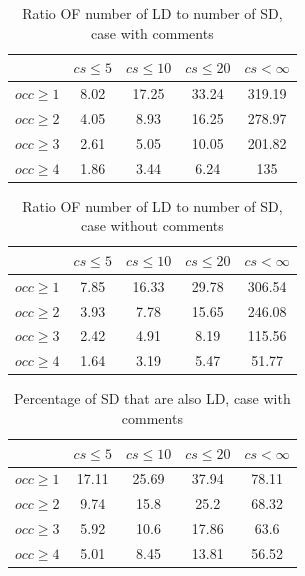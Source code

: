 \documentclass[a4paper,twoside]{article}
\begin{document}
\begin{table}[!h]
\renewcommand{\arraystretch}{1.25}
\caption{Ratio OF number of LD to number of SD, case with comments}
\label{tab:ratio:comm}
\centering

\begin{tabular}{|c|c|c|c|c|}
\hline
	      &	$cs\leq 5$	&	$cs\leq 10$	&	$cs\leq 20$	&	$cs<\infty$	\\
\hline
$occ\geq 1$	&	8.02	&	17.25	&	33.24	&	319.19	\\
$occ\geq 2$	&	4.05	&	8.93	&	16.25	&	278.97	\\
$occ\geq 3$	&	2.61	&	5.05	&	10.05	&	201.82	\\
$occ\geq 4$	&	1.86	&	3.44	&	6.24	&	135	\\
\hline
\end{tabular}
\end{table}


\begin{table}[!h]
\renewcommand{\arraystretch}{1.25}
\caption{Ratio OF number of LD to number of SD, case without comments}
\label{tab:ratio:nocomm}
\centering

\begin{tabular}{|c|c|c|c|c|}
\hline
	      &	$cs\leq 5$	&	$cs\leq 10$	&	$cs\leq 20$	&	$cs< \infty$	\\
\hline
$occ\geq 1$	&	7.85	&	16.33	&	29.78	&	306.54	\\
$occ\geq 2$	&	3.93	&	7.78	&	15.65	&	246.08	\\
$occ\geq 3$	&	2.42	&	4.91	&	8.19	&	115.56	\\
$occ\geq 4$	&	1.64	&	3.19	&	5.47	&	51.77	\\

\hline
\end{tabular}
\end{table}


\begin{table}[!h]
\renewcommand{\arraystretch}{1.25}
\caption{Percentage of SD that are also LD, case with comments}
\label{tab:percSD:comm}
\centering

\begin{tabular}{|c|c|c|c|c|}
\hline
	      &	$cs\leq 5$	&	$cs\leq 10$	&	$cs\leq 20$	&	$cs< \infty$	\\
\hline
$occ\geq 1$	&	17.11	&	25.69	&	37.94	&	78.11	\\
$occ\geq 2$	&	9.74	&	15.8	&	25.2	&	68.32	\\
$occ\geq 3$	&	5.92	&	10.6	&	17.86	&	63.6	\\
$occ\geq 4$	&	5.01	&	8.45	&	13.81	&	56.52	\\
\hline
\end{tabular}
\end{table}
\end{document}
